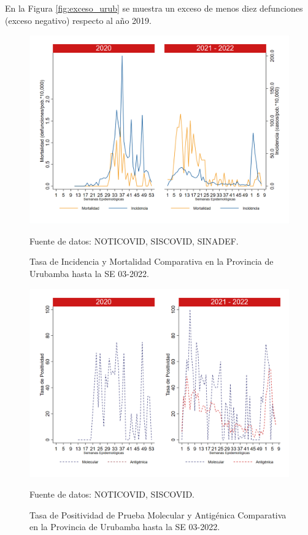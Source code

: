 \documentclass[12pt,a4paper,openany]{book}
\begin{document}
		En la Figura \ref{fig:exceso_urub} se muestra un exceso de menos diez defunciones (exceso negativo) respecto al año 2019.
		
		\begin{figure}[h]
			\caption{Tasa de Incidencia y Mortalidad Comparativa en la Provincia de Urubamba hasta la SE 03-2022.}\label{fig:inc_urub}
			\begin{center}
				\includegraphics[width=0.7\linewidth]{../figuras/incidencia_mortalidad_20_21_13.png}
			\end{center}
			{\footnotesize {Fuente de datos: NOTICOVID, SISCOVID, SINADEF.}}
		\end{figure}
		
		\begin{figure}[h]
			\caption{Tasa de Positividad de Prueba Molecular y Antigénica Comparativa en la Provincia de Urubamba hasta la SE 03-2022.}\label{fig:positividad_urub}
			\begin{center}
				\includegraphics[width=0.7\linewidth]{../figuras/positividad_20_21_13.png}
			\end{center}
			{\footnotesize {Fuente de datos: NOTICOVID, SISCOVID.}}
		\end{figure}
		
\end{document}
